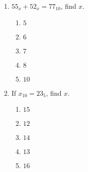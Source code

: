 \begin{multicols}{2}
\begin{enumerate}[label={\arabic*.}]
\item \({55}_x + {52}_x = {77}_{10}\), find \(x\).
	\begin{enumerate}[label={\Alph*.}]
	\item \(5\)
	\item \(6\)
	\item \(7\)
	\item \(8\)
 	\item \(10\)
	\end{enumerate}
 
\item If \(x_{10} = {23}_5\), find \(x\). 
	\begin{enumerate}[label={\Alph*.}]
	\item \( 15\)
	\item \(12\)
	\item \(14\)
	\item \(13\)
 	\item \(16\)
	\end{enumerate}
 

\end{enumerate}
\end{multicols}
